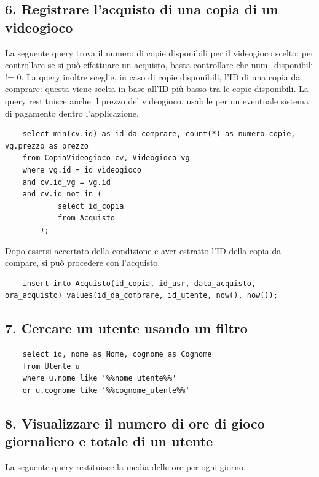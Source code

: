 \documentclass[a4paper,12pt]{report}
\begin{document}
\subsection*{6. Registrare l'acquisto di una copia di un videogioco}

La seguente query trova il numero di copie disponibili per il videogioco scelto: per controllare se si può effettuare un acquisto, basta controllare che num\_disponibili != 0. La query inoltre sceglie, in caso di copie disponibili, l'ID di una copia da comprare: questa viene scelta in base all'ID più basso tra le copie disponibili. La query restituisce anche il prezzo del videogioco, usabile per un eventuale sistema di pagamento dentro l'applicazione.

    \begin{lstlisting}
    select min(cv.id) as id_da_comprare, count(*) as numero_copie, vg.prezzo as prezzo
    from CopiaVideogioco cv, Videogioco vg
    where vg.id = id_videogioco
    and cv.id_vg = vg.id
    and cv.id not in (
    		select id_copia
    		from Acquisto
    	);
    \end{lstlisting}

Dopo essersi accertato della condizione e aver estratto l'ID della copia da compare, si può procedere con l'acquisto.

    \begin{lstlisting}    
    insert into Acquisto(id_copia, id_usr, data_acquisto, ora_acquisto) values(id_da_comprare, id_utente, now(), now());
    \end{lstlisting}

\subsection*{7. Cercare un utente usando un filtro}

    \begin{lstlisting}
    select id, nome as Nome, cognome as Cognome
    from Utente u
    where u.nome like '%%nome_utente%%'
    or u.cognome like '%%cognome_utente%%'
    \end{lstlisting}

\subsection*{8. Visualizzare il numero di ore di gioco giornaliero e totale di un utente}

La seguente query restituisce la media delle ore per ogni giorno.
\end{document}
